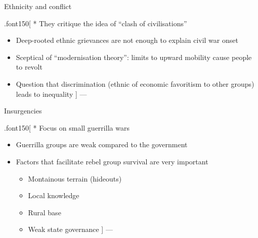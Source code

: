 \documentclass[ignorenonframetext,]{beamer}
\providecommand{\tightlist}{%
  \setlength{\itemsep}{0pt}\setlength{\parskip}{0pt}}
\begin{document}
\begin{frame}{Ethnicity and conflict}

.font150{[} * They critique the idea of ``clash of civilisations''

\begin{itemize}
\item
  Deep-rooted ethnic grievances are not enough to explain civil war
  onset
\item
  Sceptical of ``modernisation theory'': limits to upward mobility cause
  people to revolt
\item
  Question that discrimination (ethnic of economic favoritism to other
  groups) leads to inequality {]} ---
\end{itemize}

\end{frame}

\begin{frame}{Insurgencies}

.font150{[} * Focus on small guerrilla wars

\begin{itemize}
\item
  Guerrilla groups are weak compared to the government
\item
  Factors that facilitate rebel group survival are very important

  \begin{itemize}
  \tightlist
  \item
    Montainous terrain (hideouts)
  \item
    Local knowledge
  \item
    Rural base
  \item
    Weak state governance {]} ---
  \end{itemize}
\end{itemize}

\end{frame}
\end{document}
